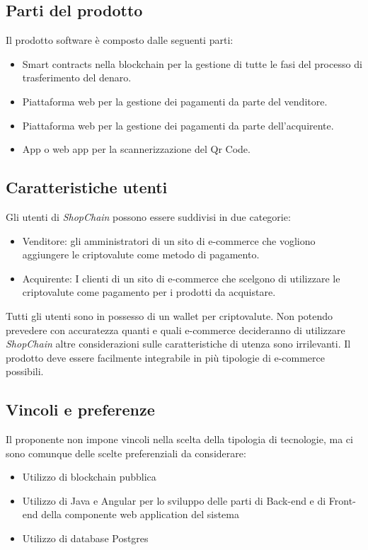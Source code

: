 \documentclass[a4paper, 12pt]{article}
\begin{document}
\subsection{Parti del prodotto}
Il prodotto software è composto dalle seguenti parti:
\begin{itemize}
\item Smart contracts nella blockchain per la gestione di tutte le fasi del processo di trasferimento del denaro.
\item Piattaforma web per la gestione dei pagamenti da parte del venditore.
\item Piattaforma web per la gestione dei pagamenti da parte dell'acquirente.
\item App o web app per la scannerizzazione del Qr Code.
\end{itemize}
\subsection{Caratteristiche utenti}
Gli utenti di \textit{ShopChain} possono essere suddivisi in due categorie:
\begin{itemize}
\item Venditore: gli amministratori di un sito di e-commerce che vogliono aggiungere le criptovalute come metodo di pagamento.
\item Acquirente: I clienti di un sito di e-commerce che scelgono di utilizzare le criptovalute come pagamento per i prodotti da acquistare.
\end{itemize}
Tutti gli utenti sono in possesso di un wallet per criptovalute. 
Non potendo prevedere con accuratezza quanti e quali e-commerce decideranno di utilizzare \textit{ShopChain} altre considerazioni sulle caratteristiche di utenza sono irrilevanti. Il prodotto deve essere facilmente integrabile in più tipologie di e-commerce possibili.

\subsection{Vincoli e preferenze}
Il proponente non impone vincoli nella scelta della tipologia di tecnologie, ma ci sono comunque delle scelte preferenziali da considerare:
\begin{itemize}
\item Utilizzo di blockchain pubblica
\item Utilizzo di Java e Angular per lo sviluppo delle parti di Back-end e di Front-end della componente web application del sistema
\item Utilizzo di database Postgres
\end{itemize}
\end{document}
